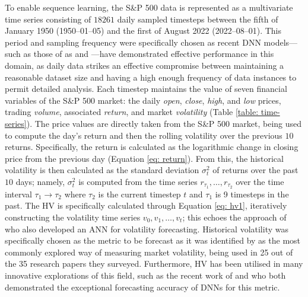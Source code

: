 \documentclass[a4paper, 11pt]{report}
\begin{document}
    To enable sequence learning, the S\&P 500 data is represented as a multivariate time series consisting of $18261$ daily sampled timesteps between the fifth of January 1950 (1950--01--05) and the first of August 2022 (2022--08--01). This period and sampling frequency were specifically chosen as recent DNN models---such as those of as \citet{bucci-2020} and \citet{rodikov-2022}---have demonstrated effective performance in this domain, as daily data strikes an effective compromise between maintaining a reasonable dataset size and having a high enough frequency of data instances to permit detailed analysis. Each timestep maintains the value of seven financial variables of the S\&P 500 market: the daily \emph{open}, \emph{close}, \emph{high}, and \emph{low} prices, trading \emph{volume}, associated \emph{return}, and market \emph{volatility} (Table \ref{table: time-series}). The price values are directly taken from the S\&P 500 market, being used to compute the day's return and then the rolling volatility over the previous $10$ returns. Specifically, the return is calculated as the logarithmic change in closing price from the previous day (Equation \ref{eq: return}). From this, the historical volatility is then calculated as the standard deviation $\sigma_{t}^2$ of returns over the past $10$ days; namely, $\sigma_{t}^2$ is computed from the time series $r_{\tau_1}, \ldots, r_{\tau_2}$ over the time interval $\tau_1 \to \tau_2$ where $\tau_2$ is the current timestep $t$ and $\tau_1$ is 9 timesteps in the past. The HV is specifically calculated through Equation \ref{eq: hv1}, iteratively constructing the volatility time series $v_0, v_1, \ldots, v_t$; this echoes the approach of \citet{lahmiri-2017} who also developed an ANN for volatility forecasting. Historical volatility was specifically chosen as the metric to be forecast as it was identified by \citet{ge-2022} as the most commonly explored way of measuring market volatility, being used in 25 out of the 35 research papers they surveyed. Furthermore, HV has been utilised in many innovative explorations of this field, such as the recent work of \citet{rahimikia-2020} and \citet{rodikov-2022} who both demonstrated the exceptional forecasting accuracy of DNNs for this metric.
\end{document}
